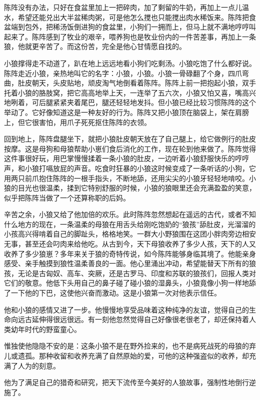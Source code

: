 \par 陈阵没有办法，只好在食盆里加上一把碎肉，加了剩留的牛奶，再加上一点儿温水，希望还能兑出大半盆稀肉粥，可是他怎么搅也只能搅出肉水稀饭来。陈阵把食盆端到包外，把稀汤饭倒进狗的食盆里，小狗们一拥而上，但马上就不满地哼哼叫起来了。陈阵感到了牧业的艰辛，喂养狗也是牧业份内的一件苦差事，再加上一条狼，他就更辛苦了。而这份苦，完全是他心甘情愿自找的。
\par 小狼撑得走不动道了，趴在地上远远地看小狗们吃剩汤。小狼吃饱了什么都好说。陈阵走近小狼，亲热地叫它的名字：小狼，小狼。小狼一骨碌翻了个身，四爪弯曲，肚皮朝天，头皮贴地，顽皮淘气地倒看着陈阵。陈阵上前一把抱起小狼，双手托着小狼的胳肢窝，把它高高地举上天，一连举了五六次，小狼又怕又喜，嘴高兴地咧着，可后腿紧紧夹着尾巴，腿还轻轻地发抖。但小狼已经比较习惯陈阵的这个举动了。它好像知道这是一种友好的行为。陈阵又把小狼顶在脑袋上，架在肩膀上，但它很害怕，用爪子死死抠住陈阵的衣领。
\par 回到地上，陈阵盘腿坐下，就把小狼肚皮朝天放在了自己腿上，给它做例行的肚皮按摩。这是母狗和母狼帮助小崽们食后消化的工作，现在轮到他来做了。陈阵觉得这件事很好玩，用巴掌慢慢揉着一条小狼的肚皮，一边听着小狼舒服快乐的哼哼声，和小狼打嗝放屁的声音。吃食时狂暴的小狼这时候变成了一条听话的小狗，它用两只前爪抱住陈阵的一根手指头，不断地舔，还用尖尖的小狼牙轻轻地啃咬。小狼的目光也很温柔，揉到它特别舒服的时候，小狼的狼眼里还会充满盈盈的笑意，似乎把陈阵当做了一个还算称职的后妈。
\par 辛苦之余，小狼又给了他加倍的欢乐。此时陈阵忽然想起在遥远的古代，或者不知什么地方的现在，一条温柔的母狼在用舌头给刚吃饱奶的“狼孩”舔肚皮，光溜溜的小孩高兴得啃着自己的脚趾头，格格地笑。一群大小野狼围在这团小胖肉旁边相安无事，甚至还会叼肉来给他吃。从古到今，天下母狼收养了多少人孩，天下的人又收养了多少狼崽？多年来关于狼的奇特传说，如今陈阵能够身临其境了。他能亲身感受、亲手触摸到狼性温柔善良的一面。他心里涌出冲动，希望能替天下所有的狼孩，无论是古匈奴、高车、突厥，还是古罗马、印度和苏联的狼孩们，回报人类对它们的敬意。他低下头用自己的鼻子碰了碰小狼的湿鼻头，小狼竟像小狗一样地舔了一下他的下巴，这使他兴奋而激动。这是小狼第一次对他表示信任。
\par 他和小狼的感情又进了一步。他慢慢地享受品味着这种纯净的友谊，觉得自己的生命向远古延伸得很远很远。有一刻他忽然觉得自己好像很老很老了，却还保持着人类幼年时代的野蛮童心。
\par 惟独使他隐隐不安的是：这条小狼不是在野外捡来的，也不是病死战死的母狼的弃儿或遗孤。那种收留和收养充满了自然原始的爱，可他的这种强盗似的收养，却充满了人为的刻意。
\par 他为了满足自己的猎奇和研究，把天下流传至今美好的人狼故事，强制性地倒行逆施了。
